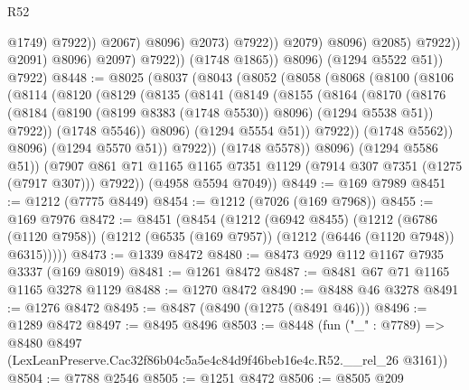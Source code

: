 \begin{lexlean}{R52}
\begin{coremodule}
                                                @1749)
                                              @7922))
                                          @2067)
                                        @8096)
                                      @2073)
                                    @7922))
                                @2079)
                              @8096)
                            @2085)
                          @7922))
                      @2091)
                    @8096)
                  @2097)
                @7922))
            (@1748 @1865))
          @8096)
        (@1294 @5522 @51))
      @7922)
@8448 := @8025
    (@8037
      (@8043
        (@8052
          (@8058
            (@8068
              (@8100
                (@8106
                  (@8114
                    (@8120
                      (@8129
                        (@8135
                          (@8141
                            (@8149
                              (@8155
                                (@8164
                                  (@8170
                                    (@8176
                                      (@8184
                                        (@8190 (@8199 @8383 (@1748 @5530)) @8096)
                                        (@1294 @5538 @51))
                                      @7922))
                                  (@1748 @5546))
                                @8096)
                              (@1294 @5554 @51))
                            @7922))
                        (@1748 @5562))
                      @8096)
                    (@1294 @5570 @51))
                  @7922))
              (@1748 @5578))
            @8096)
          (@1294 @5586 @51))
        (@7907 @861 @71 @1165 @1165 @7351 @1129 (@7914 @307 @7351 (@1275 (@7917 @307))) @7922))
      (@4958 @5594 @7049))
@8449 := @169 @7989
@8451 := @1212 (@7775 @8449)
@8454 := @1212 (@7026 (@169 @7968))
@8455 := @169 @7976
@8472 := @8451
    (@8454
      (@1212
        (@6942 @8455)
        (@1212
          (@6786 (@1120 @7958))
          (@1212 (@6535 (@169 @7957)) (@1212 (@6446 (@1120 @7948)) @6315)))))
@8473 := @1339 @8472
@8480 := @8473 @929 @112 @1167 @7935 @3337 (@169 @8019)
@8481 := @1261 @8472
@8487 := @8481 @67 @71 @1165 @1165 @3278 @1129
@8488 := @1270 @8472
@8490 := @8488 @46 @3278
@8491 := @1276 @8472
@8495 := @8487 (@8490 (@1275 (@8491 @46)))
@8496 := @1289 @8472
@8497 := @8495 @8496
@8503 := @8448
    (fun ("_" : @7789) =>
    @8480 @8497 (LexLeanPreserve.Cac32f86b04c5a5e4c84d9f46beb16e4c.R52.__rel_26 @3161))
@8504 := @7788 @2546
@8505 := @1251 @8472
@8506 := @8505 @209

\end{coremodule}
\end{lexlean}
